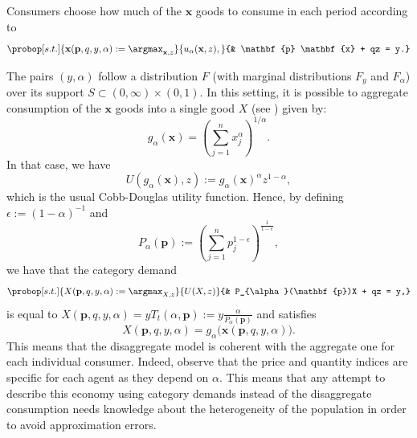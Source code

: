 \documentclass[english, a4paper, 12pt]{article}
\begin{document}
Consumers choose how much of the $\mathbf{x}$ goods to consume in each period according to
	\begin{equation} \label{eq:probdisagg}
		\probop[s.t.]{\mathbf{x}(\mathbf{p}, q, y, \alpha) 
			:= \argmax_{\mathbf{x}, z}}{u_{\alpha}(\mathbf{x}, z),}
				{&	\mathbf{p} \mathbf{x} + qz = y.}
	\end{equation} 

The pairs $(y,\alpha)$ follow a distribution $F$ (with marginal distributions $F_{y}$ and $F_{\alpha}$) over its support $S \subset (0,\infty) \times  (0,1)$. In this setting, it is possible to aggregate consumption of the $\mathbf{x}$ goods into a single good $X$ (see ) given by: 
	\begin{equation} \label{eq:qtyindex}
		g_{\alpha}(\mathbf{x}) = \left(\sum_{j=1}^{n} x_{j}^{\alpha}\right)^{1/\alpha}.
	\end{equation}
In that case, we have
	\begin{equation} \label{eq:utilagg}
		U(g_{\alpha}(\mathbf{x}), z) := g_{\alpha}(\mathbf{x})^{\alpha}z^{1-\alpha},
	\end{equation}
which is the usual Cobb-Douglas utility function. Hence, by defining $\epsilon := (1-\alpha)^{-1}$ and
	\begin{equation} \label{eq:priceindex}
		P_{\alpha}(\mathbf{p}) :=  \left( \sum_{j=1}^{n} p_{j}^{1-\epsilon} \right)^{\frac{1}{1-\epsilon}},
	\end{equation}
we have that the category demand
	\begin{equation} \label{eq:probagg}
		\probop[s.t.]{X(\mathbf{p}, q, y, \alpha) := \argmax_{X, z}}{U(X,z)}
										{&	P_{\alpha}(\mathbf{p})X + qz = y,}
	\end{equation}
is equal to $X(\mathbf{p}, q,y,\alpha) = yT_{t}(\alpha, \mathbf{p}) := y \frac{\alpha}{P_{\alpha}(\mathbf{p})}$ and satisfies 
	\begin{equation} \label{eq:aggequality}
		X(\mathbf{p}, q, y, \alpha) = g_{\alpha}\big(\mathbf{x}(\mathbf{p}, q, y, \alpha)\big).
	\end{equation}
This means that the disaggregate model is coherent with the aggregate one for each individual consumer. Indeed, observe that the price and quantity indices are specific for each agent as they depend on $\alpha$. This means that any attempt to describe this economy using category demands instead of the disaggregate consumption needs knowledge about the heterogeneity of the population in order to avoid approximation errors.
\end{document}

